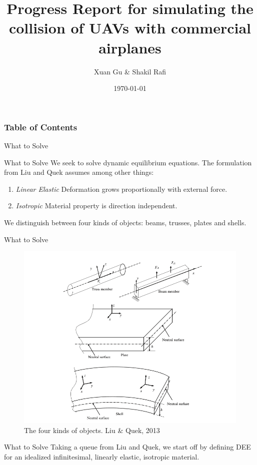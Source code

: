 \documentclass{beamer}
\title[Short title]{Progress Report for simulating the collision of UAVs with commercial airplanes}
\author{Xuan Gu \& Shakil Rafi}
\institute[University of Arkansas] 
{
University of Arkansas \\ 
\medskip
}
\date{\today}
\begin{document}
\nocite{*}
\begin{frame}
\titlepage 
\end{frame}

\begin{frame}
\frametitle{Table of Contents} 
    \tableofcontents 
\end{frame}
\begin{section}{What to Solve}
\begin{frame}{What to Solve}
    We seek to solve dynamic equilibrium equations. The formulation from Liu and Quek assumes among other things:
    \begin{enumerate}
        \item \textit{Linear Elastic} Deformation grows proportionally with external force.
        \item \textit{Isotropic} Material property is direction independent.
    \end{enumerate}
    We distinguish between four kinds of objects: beams, trusses, plates and shells.
\end{frame}
\begin{frame}{What to Solve}
    \begin{figure}
    \includegraphics[scale = 0.3]{TypesOfObjects.png}
    \caption{The four kinds of objects. Liu \& Quek, 2013}
    \end{figure}
\end{frame}
\begin{frame}{What to Solve}
    Taking a queue from Liu and Quek, we start off by defining DEE for an idealized infinitesimal, linearly elastic, isotropic material.

\end{frame}
\end{section}
\end{document}
